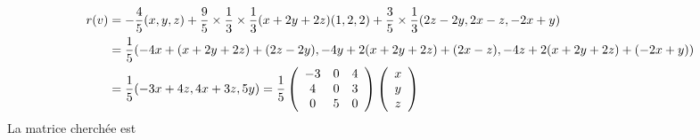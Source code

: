 {{\begin{align*}\ensuremath
r(v)&=-\frac{4}{5}(x,y,z)+\frac{9}{5}\times\frac{1}{3}\times\frac{1}{3}(x+2y+2z)(1,2,2)+\frac{3}{5}\times\frac{1}{3}
(2z-2y,2x-z,-2x+y)\\
 &=\frac{1}{5}(-4x+(x+2y+2z)+(2z-2y),-4y+2(x+2y+2z)+(2x-z),-4z+2(x+2y+2z)+(-2x+y))\\
 &=\frac{1}{5}(-3x+4z,4x+3z,5y)=\frac{1}{5}\left(
 \begin{array}{ccc}
 -3&0&4\\
 4&0&3\\
 0&5&0
 \end{array}
 \right)\left(
 \begin{array}{c}
 x\\
 y\\
 z
 \end{array}
 \right)
\end{align*}
La matrice cherchée est

\begin{center}
 \end{center}
}
}
